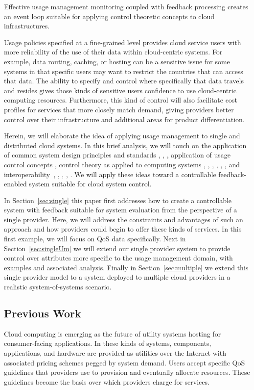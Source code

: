 \documentclass[times, 10pt,twocolumn]{article}
\begin{document}
Effective usage management monitoring coupled with feedback processing creates an event loop suitable for applying control theoretic concepts to cloud infrastructures.

Usage policies specified at a fine-grained level provides cloud service users with more reliability of the use of their data within cloud-centric systems.  For example, data routing, caching, or hosting can be a sensitive issue for some systems in that specific users may want to restrict the countries that can access that data.  The ability to specify and control where specifically that data travels and resides gives those kinds of sensitive users confidence to use cloud-centric computing resources.  Furthermore, this kind of control will also facilitate cost profiles for services that more closely match demand, giving providers better control over their infrastructure and additional areas for product differentiation.

Herein, we will elaborate the idea of applying usage management to single and distributed cloud systems.  In this brief analysis, we will touch on the application of common system design principles and standards \cite{BlCl:01}, \cite{Cl:88}, \cite{ClWrSoBr:02}, application of usage control concepts \cite{PaSa:04}, control theory as applied to computing systems \cite{ctrl:Zhu:2009:CTB:1496909.1496922}, \cite{ctrl:ariba-GL:2009}, \cite{ctrl:wang-cgswrzh:2009}, \cite{ctrl:kjaer-kr:2009}, \cite{ctrl:abdelwahed-bsk:2009}, \cite{ctrl:hellerstein-sw:2009}, and interoperability~\cite{JaHe:04}, \cite{HeJa:05}, \cite{KoLaMaMi:04}, \cite{coral}, \cite{marlin}.  We will apply these ideas toward a controllable feedback-enabled system suitable for cloud system control.

In Section~\ref{sec:single} this paper first addresses how to create a controllable system with feedback suitable for system evaluation from the perspective of a single provider. Here, we will address the constraints and advantages of such an approach and how providers could begin to offer these kinds of services.  In this first example, we will focus on QoS data specifically.  Next in Section~\ref{sec:singleUm} we will extend our single provider system to provide control over attributes more specific to the usage management domain, with examples and associated analysis.  Finally in Section~\ref{sec:multiple} we extend this single provider model to a system deployed to multiple cloud providers in a realistic system-of-systems scenario.

\subsection{Previous Work}
Cloud computing is emerging as the future of utility systems hosting for consumer-facing applications.  In these kinds of systems, components, applications, and hardware are provided as utilities over the Internet with associated pricing schemes pegged by system demand.  Users accept specific QoS guidelines that providers use to provision and eventually allocate resources. These guidelines become the basis over which providers charge for services.
\end{document}
